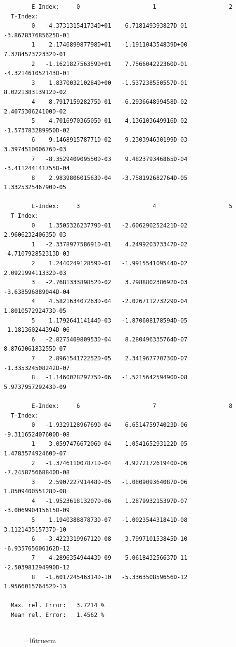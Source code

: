 \documentclass[12pt,dvips]{article}
\begin{document}
\begin{small}\begin{verbatim}
        E-Index:     0                     1                     2
  T-Index:
        0   -4.373131541734D+01    6.718149393827D-01   -3.867837685625D-01
        1    2.174689987798D+01   -1.191104354839D+00    7.378457372332D-01
        2   -1.162182756359D+01    7.756604222360D-01   -4.321461052143D-01
        3    1.837003210284D+00   -1.537238550557D-01    8.022138313912D-02
        4    8.791715928275D-01   -6.293664899458D-02    2.407530624100D-02
        5   -4.701697036505D-01    4.136103649916D-02   -1.573783289950D-02
        6    9.146891578771D-02   -9.230394630199D-03    3.397451000676D-03
        7   -8.352940909550D-03    9.482379346865D-04   -3.411244141755D-04
        8    2.983980601563D-04   -3.758192682764D-05    1.332532546790D-05

        E-Index:     3                     4                     5
  T-Index:
        0    1.350532623779D-01   -2.606290252421D-02    2.960623240635D-03
        1   -2.337897758691D-01    4.249920373347D-02   -4.710792852313D-03
        2    1.244024912859D-01   -1.991554109544D-02    2.092199411332D-03
        3   -2.768133389852D-02    3.798880238692D-03   -3.638596889044D-04
        4    4.582163407263D-04   -2.026711273229D-04    1.801057292473D-05
        5    1.179264114144D-03   -1.870608178594D-05   -1.181360244394D-06
        6   -2.827540980953D-04    8.280496335764D-07    8.876306183255D-07
        7    2.896154172252D-05    2.341967770730D-07   -1.335324508242D-07
        8   -1.146002829775D-06   -1.521564259490D-08    5.973795729243D-09

        E-Index:     6                     7                     8
  T-Index:
        0   -1.932912896769D-04    6.651475974023D-06   -9.311652407600D-08
        1    3.059747667206D-04   -1.054165293122D-05    1.478357492460D-07
        2   -1.374611007871D-04    4.927217261940D-06   -7.245875668840D-08
        3    2.590722791448D-05   -1.080909364087D-06    1.850940055128D-08
        4   -1.952361813207D-06    1.287993215397D-07   -3.006990415615D-09
        5    1.194038887873D-07   -1.002354431841D-08    3.112143515737D-10
        6   -3.422331996712D-08    3.799710153845D-10   -6.935765606162D-12
        7    4.289635494443D-09    5.061843256637D-11   -2.503981294990D-12
        8   -1.601724546314D-10   -5.336350859656D-12    1.956601576452D-13

  Max. rel. Error:   3.7214 %
  Mean rel. Error:   1.4562 %


\end{verbatim}\end{small}
\begin{figure} \label{2.2.5mai}
\epsfxsize=16truecm
\end{figure}
\newpage
\end{document}
